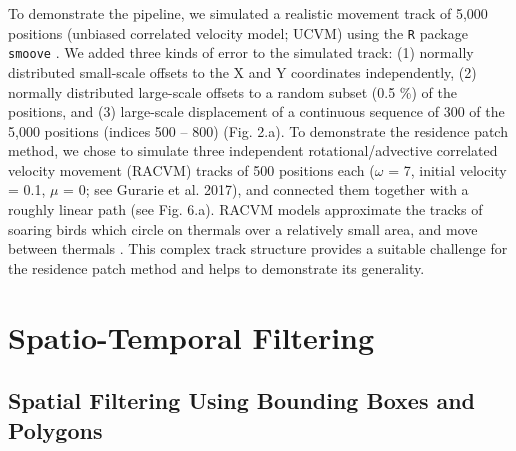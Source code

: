\documentclass[10pt,paper=a4,headings=standardclasses
]{scrartcl}
\begin{document}
To demonstrate the pipeline, we simulated a realistic movement track of 5,000 positions (unbiased correlated velocity model; UCVM) using the \texttt{R} package \texttt{smoove} \citep[][see Fig. 2.a]{gurarie2017}.
We added three kinds of error to the simulated track: (1) normally distributed small-scale offsets to the X and Y coordinates independently, (2) normally distributed large-scale offsets to a random subset (0.5 \%) of the positions, and (3) large-scale displacement of a continuous sequence of 300 of the 5,000 positions (indices 500 -- 800) (Fig. 2.a).
To demonstrate the residence patch method, we chose to simulate three independent rotational/advective correlated velocity movement (RACVM) tracks of 500 positions each ($\omega$ = 7, initial velocity = 0.1, $\mu$ = 0; see Gurarie et al. 2017), and connected them together with a roughly linear path (see Fig. 6.a).
RACVM models approximate the tracks of soaring birds which circle on thermals over a relatively small area, and move between thermals \citep[`thermalling'; ][]{gurarie2017, harel2016}.
This complex track structure provides a suitable challenge for the residence patch method and helps to demonstrate its generality.

\section{Spatio-Temporal Filtering}

\subsection{Spatial Filtering Using Bounding Boxes and Polygons}
\end{document}
